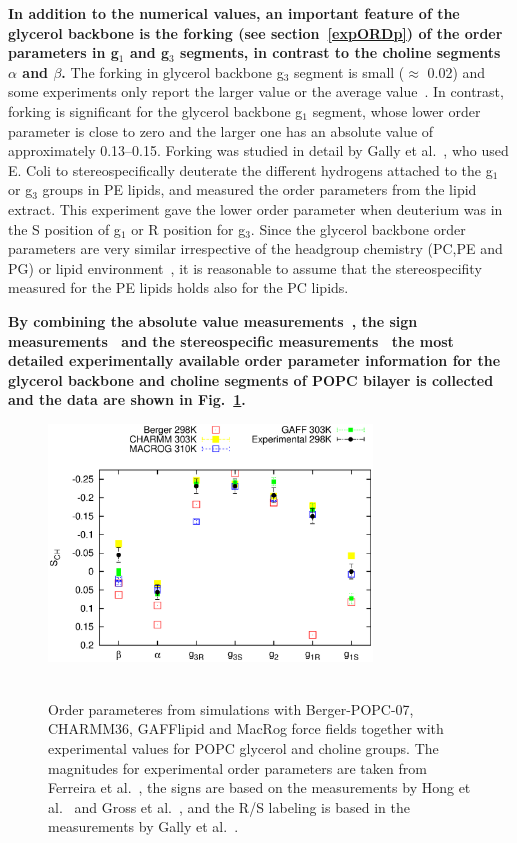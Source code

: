\documentclass[pre,aps,floatfix,authordate1-4,twocolumn]{revtex4-1}
\begin{document}
{\bf In addition to the numerical values, an important feature of the glycerol backbone is the 
forking (see section~\ref{expORDp}) of the order parameters in g$_1$ and g$_3$ segments, in contrast to the choline segments $\alpha$ and $\beta$. }
The forking in glycerol backbone g$_3$ segment is small ($\approx$ 0.02) 
and some experiments only report the larger value or the average value~\cite{akutsu81,ferreira13}. 
In contrast, forking is significant for the glycerol backbone g$_1$ segment, whose lower order parameter is close to zero and the
larger one has an absolute value of approximately 0.13--0.15. Forking was studied in detail by Gally et al.~\cite{gally81}, who used E. Coli to 
stereospecifically deuterate the different hydrogens attached to the g$_1$ or g$_3$ groups in PE lipids, and measured the order parameters from the lipid 
extract. This experiment gave the lower order parameter when deuterium was in the S position of g$_1$ or R position for g$_3$.
Since the glycerol backbone order parameters are very similar irrespective of the headgroup chemistry (PC,PE and PG) or lipid 
environment~\cite{gally81}, it is reasonable to assume that the stereospecifity measured for the PE lipids
holds also for the PC lipids.

{\bf By combining the absolute value measurements~\cite{ferreira13}, the sign measurements~\cite{hong95a,hong95b,gross97} and the stereospecific
measurements~\cite{gally81} the most detailed experimentally available order parameter information for the glycerol backbone and choline 
segments of POPC bilayer is collected and the data are shown in Fig.~\ref{HGorderparameters2}. }
\begin{figure}[]
  \centering
  \includegraphics[width=8.6cm]{HGorderparameters5.eps} \\
   \\
  \caption{\label{HGorderparameters2}
  Order parameteres from simulations with Berger-POPC-07, CHARMM36, GAFFlipid and MacRog force fields together with experimental values for POPC glycerol and choline groups.
  The magnitudes for experimental order parameters are taken from Ferreira et al.~\cite{ferreira13}, the signs are based on the measurements by Hong et al.~\cite{hong95a,hong95b} 
  and Gross et al.~\cite{gross97}, and the R/S labeling is based in the measurements by Gally et al.~\cite{gally81}.
} 
\end{figure}
\end{document}
